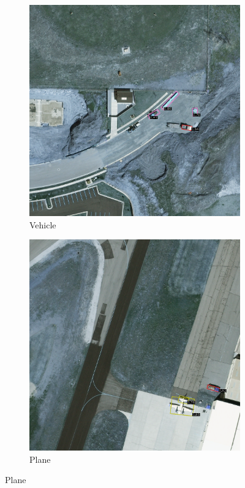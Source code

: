 \begin{figure}[h!]
    \begin{subfigure}[t]{0.38\textwidth}
        \centering
        \includegraphics[width=\linewidth]{images/015Results/02perm_exp/comp_images/rgbndvi/427.png}
        \caption{Vehicle}
    \end{subfigure}
    \begin{subfigure}[t]{0.38\textwidth}
        \centering
        \includegraphics[width=\linewidth]{images/015Results/02perm_exp/comp_images/rgbndvi/487.png}
        \caption{Plane}
    \end{subfigure}
    

\end{figure}
